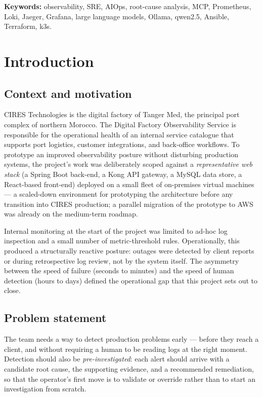 \documentclass[11pt,a4paper,oneside]{report}
\begin{document}
\vspace{1em}
\noindent\textbf{Keywords:} observability, SRE, AIOps, root-cause
analysis, MCP, Prometheus, Loki, Jaeger, Grafana, large language
models, Ollama, qwen2.5, Ansible, Terraform, k3s.

\tableofcontents
\listoffigures
\listoftables

\chapter{Introduction}
\label{ch:intro}

\section{Context and motivation}

CIRES Technologies is the digital factory of Tanger Med, the principal
port complex of northern Morocco.  The Digital Factory Observability
Service is responsible for the operational health of an internal
service catalogue that supports port logistics, customer integrations,
and back-office workflows.  To prototype an improved observability
posture without disturbing production systems, the project's work was
deliberately scoped against a \emph{representative web stack} (a
Spring Boot back-end, a Kong API gateway, a MySQL data store, a
React-based front-end) deployed on a small fleet of on-premises
virtual machines --- a scaled-down environment for prototyping the
architecture before any transition into CIRES production; a parallel
migration of the prototype to AWS was already on the medium-term
roadmap.

Internal monitoring at the start of the project was limited to ad-hoc
log inspection and a small number of metric-threshold rules.
Operationally, this produced a structurally reactive posture: outages
were detected by client reports or during retrospective log review,
not by the system itself.  The asymmetry between the speed of failure
(seconds to minutes) and the speed of human detection (hours to days)
defined the operational gap that this project sets out to close.

\section{Problem statement}

\begin{notebox}[title={Problem statement (derived from Sprint 0 field research)}]
The team needs a way to detect production problems early --- before
they reach a client, and without requiring a human to be reading logs
at the right moment.  Detection should also be \emph{pre-investigated}:
each alert should arrive with a candidate root cause, the supporting
evidence, and a recommended remediation, so that the operator's first
move is to validate or override rather than to start an investigation
from scratch.
\end{notebox}
\end{document}
